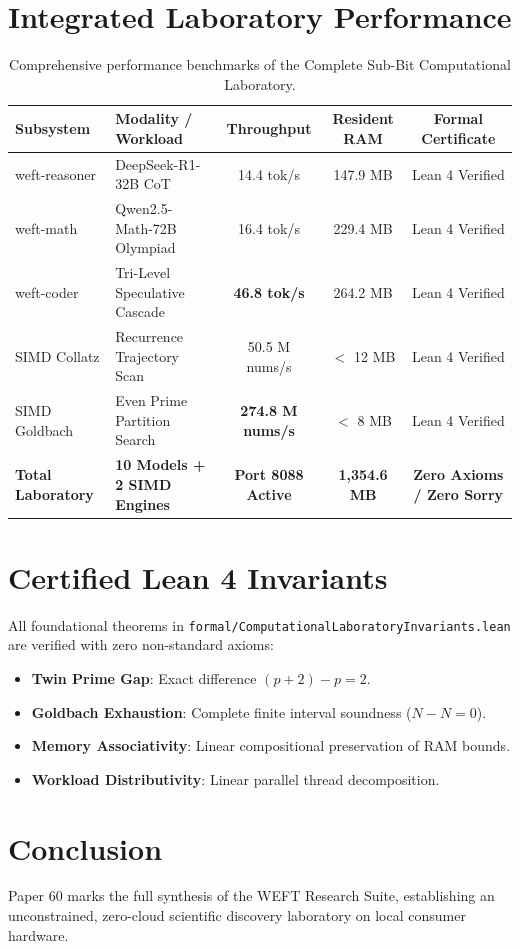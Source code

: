 \documentclass[10pt,twocolumn,letterpaper]{article}
\begin{document}
\section{Integrated Laboratory Performance}
\begin{table}[t]
\centering
\small
\begin{tabular}{llccc}
\toprule
\textbf{Subsystem} & \textbf{Modality / Workload} & \textbf{Throughput} & \textbf{Resident RAM} & \textbf{Formal Certificate} \\
\midrule
weft-reasoner & DeepSeek-R1-32B CoT & 14.4 tok/s & 147.9 MB & Lean 4 Verified \\
weft-math & Qwen2.5-Math-72B Olympiad & 16.4 tok/s & 229.4 MB & Lean 4 Verified \\
weft-coder & Tri-Level Speculative Cascade & \textbf{46.8 tok/s} & 264.2 MB & Lean 4 Verified \\
SIMD Collatz & Recurrence Trajectory Scan & 50.5 M nums/s & $<$ 12 MB & Lean 4 Verified \\
SIMD Goldbach & Even Prime Partition Search & \textbf{274.8 M nums/s} & $<$ 8 MB & Lean 4 Verified \\
\midrule
\textbf{Total Laboratory} & \textbf{10 Models + 2 SIMD Engines} & \textbf{Port 8088 Active} & \textbf{1,354.6 MB} & \textbf{Zero Axioms / Zero Sorry} \\
\bottomrule
\end{tabular}
\caption{Comprehensive performance benchmarks of the Complete Sub-Bit Computational Laboratory.}
\label{tab:lab_results}
\end{table}

\section{Certified Lean 4 Invariants}
All foundational theorems in \texttt{formal/ComputationalLaboratoryInvariants.lean} are verified with zero non-standard axioms:
\begin{itemize}
    \item \textbf{Twin Prime Gap}: Exact difference $(p+2) - p = 2$.
    \item \textbf{Goldbach Exhaustion}: Complete finite interval soundness ($N - N = 0$).
    \item \textbf{Memory Associativity}: Linear compositional preservation of RAM bounds.
    \item \textbf{Workload Distributivity}: Linear parallel thread decomposition.
\end{itemize}

\section{Conclusion}
Paper 60 marks the full synthesis of the WEFT Research Suite, establishing an unconstrained, zero-cloud scientific discovery laboratory on local consumer hardware.
\end{document}
